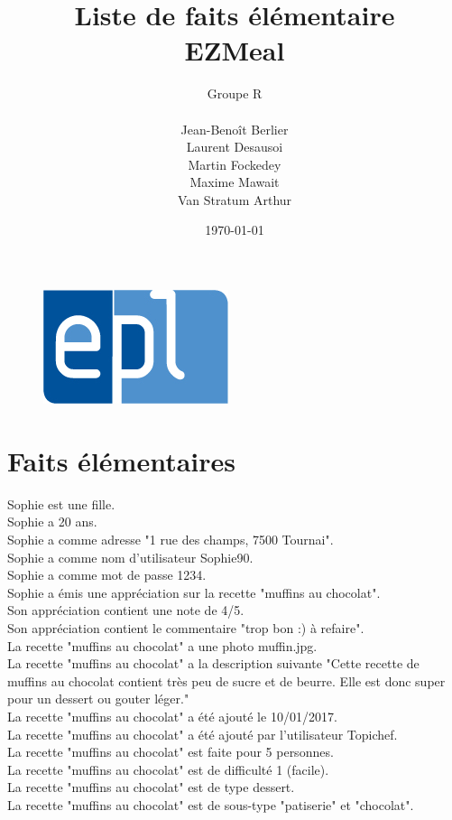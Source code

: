 \documentclass[a4paper,10pt]{article}
\title{Liste de faits élémentaire\\ EZMeal}
\author{Groupe R\\ \\Jean-Benoît Berlier\\Laurent Desausoi \\ Martin Fockedey \\Maxime Mawait \\Van Stratum Arthur
}
\date{\today}
\begin{document}
\begin{titlepage}
\begin{figure}[t]
\includegraphics[scale=0.3]{epl-logo.jpg}
\end{figure}

\maketitle 
\end{titlepage}
\section*{Faits élémentaires}
Sophie est une fille.\\
Sophie a 20 ans.\\
Sophie a comme adresse "1 rue des champs, 7500 Tournai".\\
Sophie a comme nom d'utilisateur Sophie90.\\
Sophie a comme mot de passe 1234.\\
Sophie a émis une appréciation sur la recette "muffins au chocolat".\\
Son appréciation contient une note de 4/5.\\
Son appréciation contient le commentaire "trop bon :) à refaire".\\
La recette "muffins au chocolat" a une photo muffin.jpg.\\
La recette "muffins au chocolat" a la description suivante "Cette recette de muffins au chocolat contient très peu de sucre et de beurre. Elle est donc super pour un dessert ou gouter léger."\\
La recette "muffins au chocolat" a été ajouté le 10/01/2017.\\
La recette "muffins au chocolat" a été ajouté par l'utilisateur Topichef.\\
La recette "muffins au chocolat" est faite pour 5 personnes.\\
La recette "muffins au chocolat" est de difficulté 1 (facile).\\
La recette "muffins au chocolat" est de type dessert.\\
La recette "muffins au chocolat" est de sous-type "patiserie" et "chocolat".\\
\end{document}
